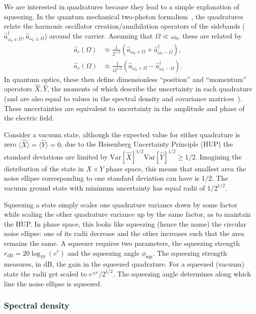 \documentclass[aps,pra,superscriptaddress,reprint,nofootinbib]{revtex4-1}
\begin{document}
We are interested in quadratures because they lead to a simple explanation of squeezing. In the quantum mechanical two-photon formalism~\cite{Danilishin_2012}, the quadratures relate the harmonic oscillator creation/annihilation operators of the sidebands ($\hat{a}_{\omega_0 \pm \Omega}^\dagger, \hat{a}_{\omega_0 \pm \Omega}$) around the carrier. Assuming that $\Omega \ll \omega_0$, these are related by
\begin{align*}
\hat{a}_c(\Omega) &\approx \frac{1}{2^{1/2}} (\hat{a}_{\omega_0 + \Omega} + \hat{a}_{\omega_0 - \Omega}^\dagger),\\
\hat{a}_s(\Omega) &\approx \frac{1}{i 2^{1/2}} (\hat{a}_{\omega_0 + \Omega} - \hat{a}_{\omega_0 - \Omega}^\dagger).
\end{align*}
In quantum optics, these then define dimensionless “position” and “momentum” operators $\hat{X}, \hat{Y}$, the moments of which describe the uncertainty in each quadrature (and are also equal to values in the spectral density and covariance matrices~\cite{Danilishin_2012}). These uncertainties are equivalent to uncertainty in the amplitude and phase of the electric field.


Consider a vacuum state, although the expected value for either quadrature is zero $\langle \hat{X} \rangle = \langle \hat{Y} \rangle = 0$, due to the Heisenberg Uncertainty Principle (HUP) the standard deviations are limited by $\mathrm{Var}[\hat{X}]^{1/2} \mathrm{Var}[\hat{Y}]^{1/2} \geq 1/2$. Imagining the distribution of the state in $X \times Y$ phase space, this means that smallest area the noise ellipse corresponding to one standard deviation can have is $1/2$. The vacuum ground state with minimum uncertainty has equal radii of $1/2^{1/2}$.


Squeezing a state simply scales one quadrature variance down by some factor while scaling the other quadrature variance up by the same factor, as to maintain the HUP. In phase space, this looks like squeezing (hence the name) the circular noise ellipse: one of its radii decrease and the other increases such that the area remains the same. A squeezer requires two parameters, the squeezing strength $r_{\mathrm{dB}} = 20 \log_{10}(e^r)$ and the squeezing angle $\phi_{\mathrm{sqz}}$. The squeezing strength measures, in dB, the gain in the squeezed quadrature. For a squeezed (vacuum) state the radii get scaled to $e^{\pm r}/2^{1/2}$. The squeezing angle determines along which line the noise ellipse is squeezed.

\subsubsection{Spectral density}
\end{document}
